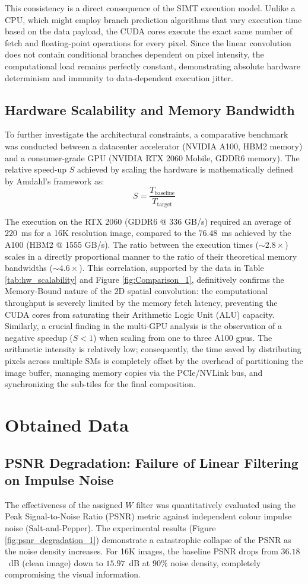 \documentclass[conference]{IEEEtran}
\numberwithin{figure}{section}
\numberwithin{table}{section}
\begin{document}
This consistency is a direct consequence of the SIMT execution model. Unlike a CPU, which might employ branch prediction algorithms that vary execution time based on the data payload, the CUDA cores execute the exact same number of fetch and floating-point operations for every pixel. Since the linear convolution does not contain conditional branches dependent on pixel intensity, the computational load remains perfectly constant, demonstrating absolute hardware determinism and immunity to data-dependent execution jitter.

\subsection*{Hardware Scalability and Memory Bandwidth}
To further investigate the architectural constraints, a comparative benchmark was conducted between a datacenter accelerator (NVIDIA A100, HBM2 memory) and a consumer-grade GPU (NVIDIA RTX 2060 Mobile, GDDR6 memory). The relative speed-up $S$ achieved by scaling the hardware is mathematically defined by Amdahl's framework as:
$$ S = \frac{T_{\text{baseline}}}{T_{\text{target}}} $$

The execution on the RTX 2060 (GDDR6 @ 336 GB/s) required an average of $220$~ms for a 16K resolution image, compared to the $76.48$~ms achieved by the A100 (HBM2 @ 1555 GB/s). The ratio between the execution times ($\sim2.8\times$) scales in a directly proportional manner to the ratio of their theoretical memory bandwidths ($\sim4.6\times$). This correlation, supported by the data in Table \ref{tab:hw_scalability} and Figure \ref{fig:Comparison_1}, definitively confirms the Memory-Bound nature of the 2D spatial convolution: the computational throughput is severely limited by the memory fetch latency, preventing the CUDA cores from saturating their Arithmetic Logic Unit (ALU) capacity. Similarly, a crucial finding in the multi-GPU analysis is the observation of a negative speedup ($S < 1$) when scaling from one to three A100 gpus. The arithmetic intensity is relatively low; consequently, the time saved by distributing pixels across multiple SMs is completely offset by the overhead of partitioning the image buffer, managing memory copies via the PCIe/NVLink bus, and synchronizing the sub-tiles for the final composition.

\section*{Obtained Data}
\subsection*{PSNR Degradation: Failure of Linear Filtering on Impulse Noise}
The effectiveness of the assigned $W$ filter was quantitatively evaluated using the Peak Signal-to-Noise Ratio (PSNR) metric against independent colour impulse noise (Salt-and-Pepper). The experimental results (Figure \ref{fig:psnr_degradation_1}) demonstrate a catastrophic collapse of the PSNR as the noise density increases. For 16K images, the baseline PSNR drops from $36.18$~dB (clean image) down to $15.97$~dB at $90\%$ noise density, completely compromising the visual information.

\end{document}
